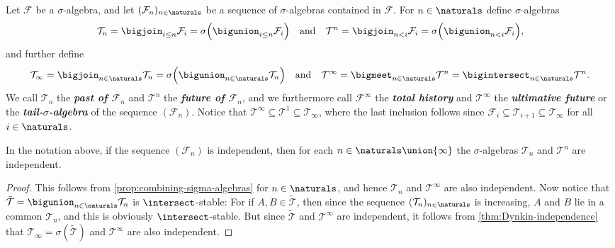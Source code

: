 \documentclass[article, a4paper, 11pt, oneside]{memoir}
\numberwithin{equation}{chapter}
\newcommand{\calT}{\mathcal{T}}
\newcommand{\calF}{\mathcal{F}}
\newcommand{\keyword}[1]{{\itshape\bfseries #1}}
\begin{document}
Let $\calF$ be a $\sigma$-algebra, and let $(\calF_n)_{n \in \naturals}$ be a sequence of $\sigma$-algebras contained in $\calF$. For $n \in \naturals$ define $\sigma$-algebras
%
\begin{equation*}
    \calT_n
        = \bigjoin_{i \leq n} \calF_i
        = \sigma \Bigl( \bigunion_{i \leq n} \calF_i \Bigr)
    \quad \text{and} \quad
    \calT^n
        = \bigjoin_{n < i} \calF_i
        = \sigma \Bigl( \bigunion_{n < i} \calF_i \Bigr),
\end{equation*}
%
and further define
%
\begin{equation*}
    \calT_\infty
        = \bigjoin_{n \in \naturals} \calT_n
        = \sigma \Bigl( \bigunion_{n \in \naturals} \calT_n \Bigr)
    \quad \text{and} \quad
    \calT^\infty
        = \bigmeet_{n \in \naturals} \calT^n
        = \bigintersect_{n \in \naturals} \calT^n.
\end{equation*}
%
We call $\calT_n$ the \keyword{past of $\calF_n$} and $\calT^n$ the \keyword{future of $\calF_n$}, and we furthermore call $\calF^\infty$ the \keyword{total history} and $\calT^\infty$ the \keyword{ultimative future} or the \keyword{tail-$\sigma$-algebra} of the sequence $(\calF_n)$. Notice that $\calT^\infty \subseteq \calT^1 \subseteq \calT_\infty$, where the last inclusion follows since $\calF_i \subseteq \calT_{i+1} \subseteq \calT_\infty$ for all $i \in \naturals$.


\begin{lemma}
    \label{lem:tail-sigma-algebra-independence}
    In the notation above, if the sequence $(\calF_n)$ is independent, then for each $n \in \naturals \union \{\infty\}$ the $\sigma$-algebras $\calT_n$ and $\calT^n$ are independent.
\end{lemma}

\begin{proof}
    This follows from \cref{prop:combining-sigma-algebras} for $n \in \naturals$, and hence $\calT_n$ and $\calT^\infty$ are also independent. Now notice that $\tilde{\calT} = \bigunion_{n \in \naturals} \calT_n$ is $\intersect$-stable: For if $A,B \in \tilde{\calT}$, then since the sequence $(\calT_n)_{n \in \naturals}$ is increasing, $A$ and $B$ lie in a common $\calT_n$, and this is obviously $\intersect$-stable. But since $\tilde{\calT}$ and $\calT^\infty$ are independent, it follows from \cref{thm:Dynkin-independence} that $\calT_\infty = \sigma(\tilde{\calT})$ and $\calT^\infty$ are also independent.
\end{proof}
\end{document}

